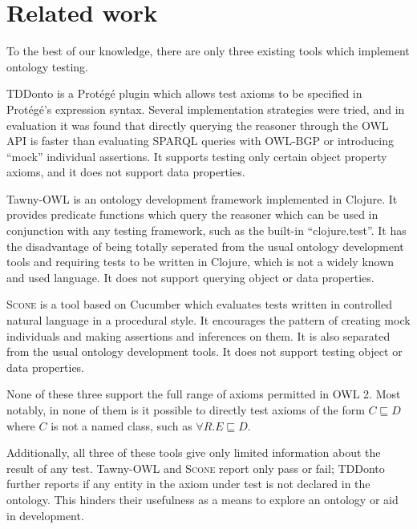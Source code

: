 \documentclass[paper.tex]{subfiles}
\begin{document}
\section{Related work}
\label{sec:related}

To the best of our knowledge, there are only three existing tools which implement ontology testing.

TDDonto \cite{Lawrynowicz:TDDontoTool} is a Prot\'eg\'e plugin which allows test axioms to be specified in Prot\'eg\'e's expression syntax.
Several implementation strategies were tried, and in evaluation it was found that directly querying the reasoner through the OWL API \cite{OWLAPI} is faster than evaluating SPARQL queries with OWL-BGP \cite{OWLBGP} or introducing ``mock'' individual assertions.
It supports testing only certain object property axioms, and it does not support data properties.

Tawny-OWL \cite{Warrender:HowWhatWhyTest} is an ontology development framework implemented in Clojure.
It provides predicate functions which query the reasoner which can be used in conjunction with any testing framework, such as the built-in ``clojure.test''.
It has the disadvantage of being totally seperated from the usual ontology development tools and requiring tests to be written in Clojure, which is not a widely known and used language.
It does not support querying object or data properties.

\textsc{Scone} \cite{Scone:Bitbucket} is a tool based on Cucumber \cite{Cucumber} which evaluates tests written in controlled natural language in a procedural style.
It encourages the pattern of creating mock individuals and making assertions and inferences on them.
It is also separated from the usual ontology development tools.  It does not support testing object or data properties.

None of these three support the full range of axioms permitted in OWL 2.
Most notably, in none of them is it possible to directly test axioms of the form $C \sqsubseteq D$ where $C$ is not a named class, such as $\forall R.E \sqsubseteq D$.

Additionally, all three of these tools give only limited information about the result of any test.
Tawny-OWL and \textsc{Scone} report only pass or fail; TDDonto further reports if any entity in the axiom under test is not declared in the ontology.
This hinders their usefulness as a means to explore an ontology or aid in development.
\end{document}
